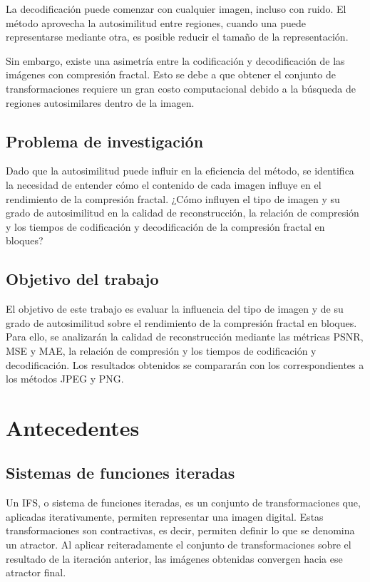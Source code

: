 \documentclass[a4paper]{llncs}
\begin{document}
La decodificación puede comenzar con cualquier imagen, incluso con ruido. El método aprovecha la autosimilitud entre regiones, cuando una puede representarse mediante otra, es posible reducir el tamaño de la representación.

Sin embargo, existe una asimetría entre la codificación y decodificación de las imágenes con compresión fractal. Esto se debe a que obtener el conjunto de transformaciones requiere un gran costo computacional debido a la búsqueda de regiones autosimilares dentro de la imagen.

\subsection{Problema de investigación}

Dado que la autosimilitud puede influir en la eficiencia del método, se identifica la necesidad de entender cómo el contenido de cada imagen influye en el rendimiento de la compresión fractal. ¿Cómo influyen el tipo de imagen y su grado de autosimilitud en la calidad de reconstrucción, la relación de compresión y los tiempos de codificación y decodificación de la compresión fractal en bloques?

\subsection{Objetivo del trabajo}

El objetivo de este trabajo es evaluar la influencia del tipo de imagen y de su grado de autosimilitud sobre el rendimiento de la compresión fractal en bloques. Para ello, se analizarán la calidad de reconstrucción mediante las métricas PSNR, MSE y MAE, la relación de compresión y los tiempos de codificación y decodificación. Los resultados obtenidos se compararán con los correspondientes a los métodos JPEG y PNG.

\section{Antecedentes}

\subsection{Sistemas de funciones iteradas}

Un IFS, o sistema de funciones iteradas, es un conjunto de transformaciones que, aplicadas iterativamente, permiten representar una imagen digital. Estas transformaciones son contractivas, es decir, permiten definir lo que se denomina un atractor. Al aplicar reiteradamente el conjunto de transformaciones sobre el resultado de la iteración anterior, las imágenes obtenidas convergen hacia ese atractor final.
\end{document}

